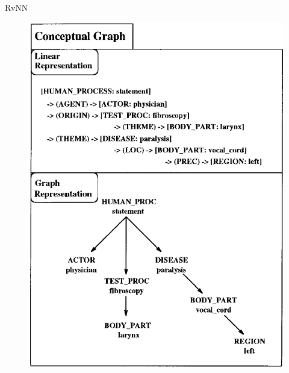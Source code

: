 \documentclass[14pt,aspectratio=169,hyperref={pdftex,unicode},xcolor=dvipsnames]{beamer}
\begin{document}
\begin{frame}[noframenumbering]{RvNN \cite{rvnn-intro-paper} \cite{rvnn-intro-paper-2}}

\begin{center}

\begin{minipage}{0.5\textwidth}

\begin{figure}[ht]
\begin{center}
  \includegraphics[scale=0.14]{./assets/rvnn-data-tree.png}
\end{center}
\end{figure}

\end{minipage}%
\begin{minipage}{0.5\textwidth}


\end{minipage}
\end{center}
\end{frame}
\end{document}

